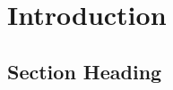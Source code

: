 \documentclass{standalone}
\begin{document}
\graphicspath{{./images/introduction/}}%
\chapter{Introduction}
\label{chap:intro}
\Blindtext[2]

\section{Section Heading}
\label{sec:intro:sec1}
\Blindtext[2]
\end{document}
